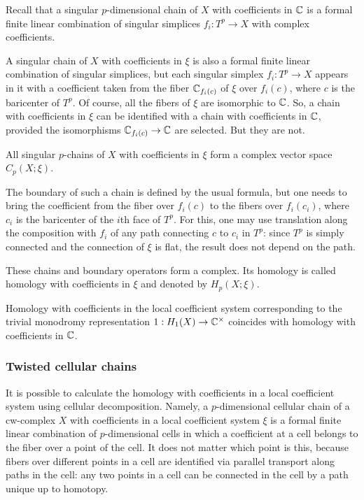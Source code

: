 \documentclass{article}
\numberwithin{equation}{section}
\begin{document}
Recall that a singular $p$-dimensional chain 
of $X$ with coefficients in $\mathbb C$ is a formal finite linear combination 
of singular simplices $f_i:T^p\to X$ with complex coefficients. 

A singular chain of $X$ with coefficients in $\xi$ is also a formal
finite linear combination of singular simplices, but each singular
simplex $f_i:T^p\to X$ appears 
in it with a coefficient taken from the fiber $\mathbb C_{f_i(c)}$ of $\xi$ 
over $f_i(c)$,
where $c$ is the baricenter of $T^p$. Of course, all
the fibers of $\xi$ are isomorphic to $\mathbb C$. So, a chain with
coefficients in $\xi$ can be identified with a chain with coefficients
in $\mathbb C$, provided the isomorphisms $\mathbb C_{f_i(c)}\to\mathbb C$ are selected. 
But they are not. 

All singular $p$-chains of $X$ with coefficients in $\xi$ form a 
complex vector space $C_p(X;\xi)$. 

The boundary of such a chain is defined by the usual formula, but one 
needs to bring the coefficient
from the fiber over  $f_i(c)$ to the fibers over $f_i(c_i)$, where $c_i$
is the baricenter of the $i$th face of $T^p$. 
For this, one may use translation along the composition with $f_i$ of 
any path connecting $c$ to $c_i$ in $T^p$: since $T^p$ is simply
connected and the connection of $\xi$ is flat, the result does not
depend on the path. 

These chains and boundary operators form a complex. Its homology is
called {\sfit homology with coefficients in\/} $\xi$ and denoted by 
$H_p(X;\xi)$. 

Homology with coefficients in the local coefficient system corresponding 
to the trivial monodromy representation $1:H_1(X)\to\mathbb C^\times$ coincides 
with homology with coefficients in $\mathbb C$.

\subsubsection{Twisted cellular chains}\label{sT.1.4} 
It is possible to calculate the homology with coefficients in a 
local coefficient system using cellular decomposition. Namely, a
$p$-dimensional cellular chain of a cw-complex $X$ with coefficients in
a local coefficient system $\xi$ is a formal finite linear combination
of $p$-dimensional cells in which a coefficient at a cell belongs to 
the fiber over a point of the cell. It does not matter which point is
this, because fibers over different points in a cell are identified via
parallel transport along paths in the cell: any two points in a cell 
can be connected in the cell by a path unique up to homotopy.
\end{document}
